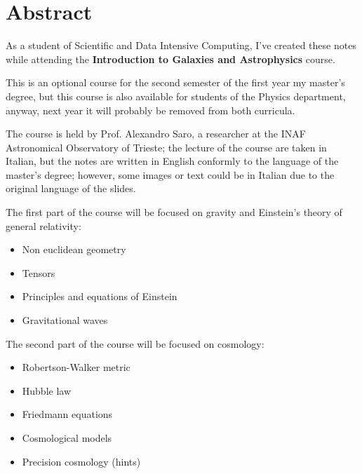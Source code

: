 \chapter*{Abstract}

As a student of Scientific and Data Intensive Computing, I've created these notes while attending the \textbf{Introduction to Galaxies and Astrophysics} course.

This is an optional course for the second semester of the first year my master's degree, but this course is also available for students of the Physics department, anyway, next year it will probably be removed from both curricula. 

The course is held by Prof. Alexandro Saro, a researcher at the INAF Astronomical Observatory of Trieste; the lecture of the course are taken in Italian, but the notes are written in English conformly to the language of the master's degree; however, some images or text could be in Italian due to the original language of the slides.

\vspace{0.5em}

The first part of the course will be focused on gravity and Einstein's theory of general relativity:

\begin{itemize}
    \item Non euclidean geometry
    \item Tensors
    \item Principles and equations of Einstein
    \item Gravitational waves
\end{itemize}

\vspace{0.5em}

The second part of the course will be focused on cosmology:

\begin{itemize}
    \item Robertson-Walker metric
    \item Hubble law
    \item Friedmann equations
    \item Cosmological models
    \item Precision cosmology (hints)
\end{itemize}
